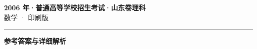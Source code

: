 \documentclass[zihao=5, a4paper]{ctexart}
\begin{document}
\begin{center}
  {\Large\bfseries 2006 年·普通高等学校招生考试·山东卷理科}\\[4pt]
  {\large 数学 · 印刷版}
\end{center}
\medskip
{}

\par\bigskip\hrule\bigskip
{}
\begin{center}{\large\bfseries 参考答案与详细解析}\end{center}
\smallskip

\end{document}
